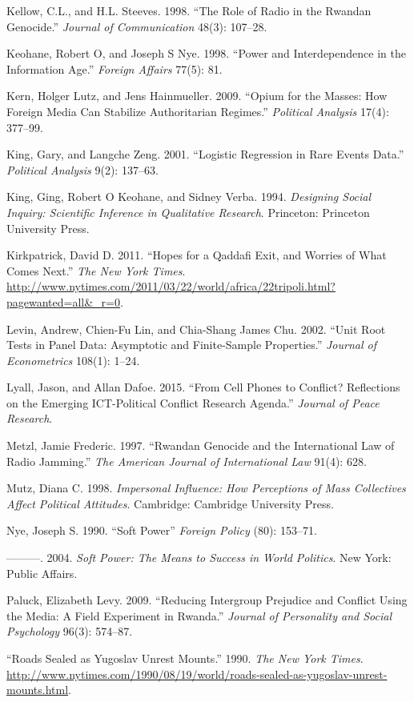 \documentclass[11pt,article,oneside]{memoir}
\begin{document}
Kellow, C.L., and H.L. Steeves. 1998. ``The Role of Radio in the Rwandan
Genocide.'' \emph{Journal of Communication} 48(3): 107--28.

Keohane, Robert O, and Joseph S Nye. 1998. ``Power and Interdependence
in the Information Age.'' \emph{Foreign Affairs} 77(5): 81.

Kern, Holger Lutz, and Jens Hainmueller. 2009. ``Opium for the Masses:
How Foreign Media Can Stabilize Authoritarian Regimes.'' \emph{Political
Analysis} 17(4): 377--99.

King, Gary, and Langche Zeng. 2001. ``Logistic Regression in Rare Events
Data.'' \emph{Political Analysis} 9(2): 137--63.

King, Ging, Robert O Keohane, and Sidney Verba. 1994. \emph{Designing
Social Inquiry: Scientific Inference in Qualitative Research}.
Princeton: Princeton University Press.

Kirkpatrick, David D. 2011. ``Hopes for a Qaddafi Exit, and Worries of
What Comes Next.'' \emph{The New York Times}.
\url{http://www.nytimes.com/2011/03/22/world/africa/22tripoli.html?pagewanted=all\&_r=0}.

Levin, Andrew, Chien-Fu Lin, and Chia-Shang James Chu. 2002. ``Unit Root
Tests in Panel Data: Asymptotic and Finite-Sample Properties.''
\emph{Journal of Econometrics} 108(1): 1--24.

Lyall, Jason, and Allan Dafoe. 2015. ``From Cell Phones to Conflict?
Reflections on the Emerging ICT-Political Conflict Research Agenda.''
\emph{Journal of Peace Research}.

Metzl, Jamie Frederic. 1997. ``Rwandan Genocide and the International
Law of Radio Jamming.'' \emph{The American Journal of International Law}
91(4): 628.

Mutz, Diana C. 1998. \emph{Impersonal Influence: How Perceptions of Mass
Collectives Affect Political Attitudes}. Cambridge: Cambridge University
Press.

Nye, Joseph S. 1990. ``Soft Power'' \emph{Foreign Policy} (80): 153--71.

---------. 2004. \emph{Soft Power: The Means to Success in World
Politics}. New York: Public Affairs.

Paluck, Elizabeth Levy. 2009. ``Reducing Intergroup Prejudice and
Conflict Using the Media: A Field Experiment in Rwanda.'' \emph{Journal
of Personality and Social Psychology} 96(3): 574--87.

``Roads Sealed as Yugoslav Unrest Mounts.'' 1990. \emph{The New York
Times}.
\url{http://www.nytimes.com/1990/08/19/world/roads-sealed-as-yugoslav-unrest-mounts.html}.
\end{document}
